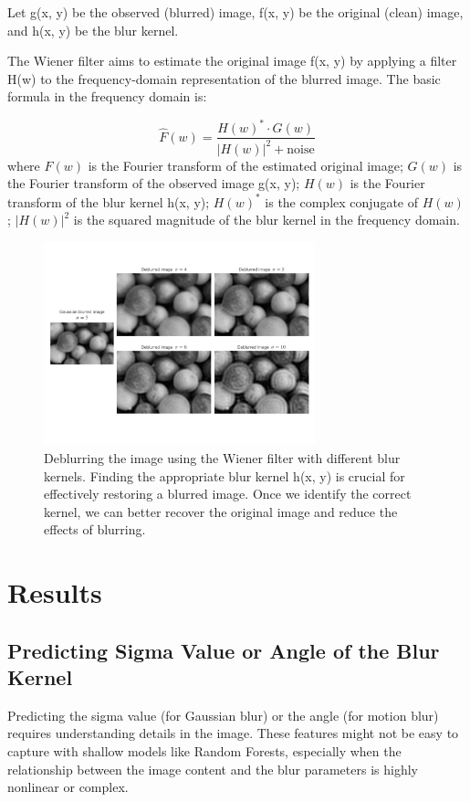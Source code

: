 \documentclass[twoside,11pt]{article}
\begin{document}
Let  g(x, y)  be the observed (blurred) image,  f(x, y)  be the original (clean) image, and  h(x, y)  be the blur kernel.

The Wiener filter aims to estimate the original image  f(x, y)  by applying a filter  H(w)  to the frequency-domain representation of the blurred image. The basic formula in the frequency domain is:

\[
\hat{F}(w) = \frac{H(w)^* \cdot G(w)}{|H(w)|^2 + \text{noise}}
\]
where \(F(w)\) is the Fourier transform of the estimated original image; \(G(w)\) is the Fourier transform of the observed image g(x, y); \(H(w)\) is the Fourier transform of the blur kernel h(x, y); \(H(w)^*\) is the complex conjugate of \(H(w)\); \(|H(w)|^2\) is the squared magnitude of the blur kernel in the frequency domain.

\begin{figure}[H]
\centering
\includegraphics[width=0.7\textwidth]{figure7.jpg}
\caption{Deblurring the image using the Wiener filter with different blur kernels. 
Finding the appropriate blur kernel  h(x, y)  is crucial for effectively restoring a blurred image. Once we identify the correct kernel, we can better recover the original image and reduce the effects of blurring.}

\end{figure}

\section{Results}

\subsection{Predicting Sigma Value or Angle of the Blur Kernel}
Predicting the sigma value (for Gaussian blur) or the angle (for motion blur) requires understanding details in the image. These features might not be easy to capture with shallow models like Random Forests, especially when the relationship between the image content and the blur parameters is highly nonlinear or complex.

\end{document}
